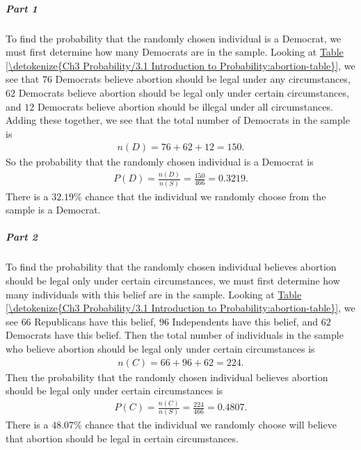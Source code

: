 \documentclass[letterpaper,10pt,english]{jupyterBook}
\begin{document}
\subparagraph{Part 1}
\label{\detokenize{Ch3 Probability/3.1 Introduction to Probability:id11}}
\sphinxAtStartPar
To find the probability that the randomly chosen individual is a Democrat, we must first determine how many Democrats are in the sample. Looking at \hyperref[\detokenize{Ch3 Probability/3.1 Introduction to Probability:abortion-table}]{Table \ref{\detokenize{Ch3 Probability/3.1 Introduction to Probability:abortion-table}}}, we see that \(76\) Democrats believe abortion should be legal under any circumstances, \(62\) Democrats believe abortion should be legal only under certain circumstances, and \(12\) Democrats believe abortion should be illegal under all circumstances. Adding these together, we see that the total number of Democrats in the sample is
\begin{equation*}
\begin{split} n(D) = 76 + 62 + 12 = 150. \end{split}
\end{equation*}
\sphinxAtStartPar
So the probability that the randomly chosen individual is a Democrat is
\begin{equation*}
\begin{split} P(D) = \frac{n(D)}{n(S)} = \frac{150}{466} = 0.3219. \end{split}
\end{equation*}
\sphinxAtStartPar
There is a \(32.19\%\) chance that the individual we randomly choose from the sample is a Democrat.


\subparagraph{Part 2}
\label{\detokenize{Ch3 Probability/3.1 Introduction to Probability:id12}}
\sphinxAtStartPar
To find the probability that the randomly chosen individual believes abortion should be legal only under certain circumstances, we must first determine how many individuals with this belief are in the sample. Looking at \hyperref[\detokenize{Ch3 Probability/3.1 Introduction to Probability:abortion-table}]{Table \ref{\detokenize{Ch3 Probability/3.1 Introduction to Probability:abortion-table}}}, we see \(66\) Republicans have this belief, \(96\) Independents have this belief, and \(62\) Democrats have this belief. Then the total number of individuals in the sample who believe abortion should be legal only under certain circumstances is
\begin{equation*}
\begin{split} n(C) = 66 + 96 + 62 = 224. \end{split}
\end{equation*}
\sphinxAtStartPar
Then the probability that the randomly chosen individual believes abortion should be legal only under certain circumstances is
\begin{equation*}
\begin{split} P(C) = \frac{n(C)}{n(S)} = \frac{224}{466} = 0.4807. \end{split}
\end{equation*}
\sphinxAtStartPar
There is a \(48.07\%\) chance that the individual we randomly choose will believe that abortion should be legal in certain circumstances.
\end{document}
